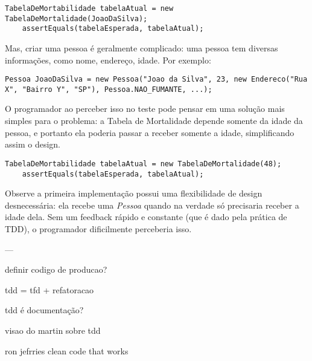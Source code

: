 \begin{lstlisting}[frame=trbl]
	TabelaDeMortabilidade tabelaAtual = new TabelaDeMortalidade(JoaoDaSilva);
	assertEquals(tabelaEsperada, tabelaAtual);
\end{lstlisting}

Mas, criar uma pessoa é geralmente complicado: uma pessoa tem diversas informações, como nome, endereço, idade. Por exemplo:

\begin{lstlisting}[frame=trbl]
	Pessoa JoaoDaSilva = new Pessoa("Joao da Silva", 23, new Endereco("Rua X", "Bairro Y", "SP"), Pessoa.NAO_FUMANTE, ...);
\end{lstlisting}

O programador ao perceber isso no teste pode pensar em uma solução mais simples para o problema: a Tabela de Mortalidade depende
somente da idade da pessoa, e portanto ela poderia passar a receber somente a idade, simplificando assim o design.

\begin{lstlisting}[frame=trbl]
	TabelaDeMortabilidade tabelaAtual = new TabelaDeMortalidade(48);
	assertEquals(tabelaEsperada, tabelaAtual);
\end{lstlisting}

Observe a primeira implementação possui uma flexibilidade de design desnecessária: ela recebe uma \textit{Pessoa} quando na verdade só
precisaria receber a idade dela. Sem um feedback rápido e constante (que é dado pela prática de TDD), o programador dificilmente
perceberia isso.

---


definir codigo de producao?


tdd = tfd + refatoracao

tdd é documentação?

visao do martin sobre tdd

ron jefrries clean code that works

